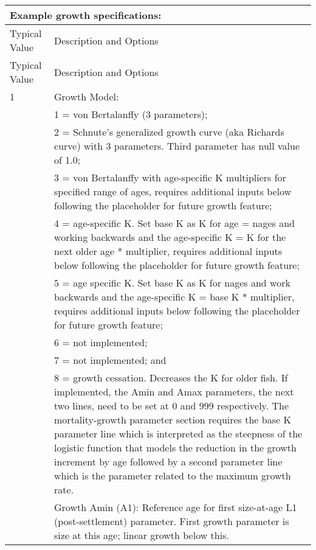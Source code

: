 \vspace*{-\baselineskip}	
\begin{longtable}{p{0.5cm} p{2cm} p{12.5cm}}
	\multicolumn{3}{l}{Example growth specifications:} \Tstrut\Bstrut\\
	\hline	
	\multicolumn{2}{l}{Typical Value} & Description and Options \Tstrut\Bstrut\\
	\hline
	\endfirsthead

	\hline
	\multicolumn{2}{l}{Typical Value} & Description and Options \Tstrut\Bstrut\\
	\hline
	\endhead
	\hline

	\endfoot
	
	\endlastfoot

	1 & & Growth Model: \Tstrut\\
	  & & 1 = von Bertalanffy (3 parameters); \\
	  & & 2 = Schnute's generalized growth curve (aka Richards curve) with 3 parameters. Third parameter has null value of 1.0; \\
	  & & 3 = von Bertalanffy with age-specific K multipliers for specified range of ages, requires additional inputs below following the placeholder for future growth feature; \\
	  & & 4 = age-specific K. Set base K as K for age = nages and working backwards and the age-specific K = K for the next older age * multiplier, requires additional inputs below following the placeholder for future growth feature; \\
	  & & 5 = age specific K. Set base K as K for nages and work backwards and the age-specific K = base K * multiplier, requires additional inputs below following the placeholder for future growth feature; \\
	  & & 6 = not implemented; \\
	  & & 7 = not implemented; and \\
	  & & 8 = growth cessation. Decreases the K for older fish. If implemented, the Amin and Amax parameters, the next two lines, need to be set at 0 and 999 respectively. The mortality-growth parameter section requires the base K parameter line which is interpreted as the steepness of the logistic function that models the reduction in the growth increment by age followed by a second parameter line which is the parameter related to the maximum growth rate. \Bstrut\\
	\hline

	\Tstrut 1 & & Growth Amin (A1): Reference age for first size-at-age L1 (post-settlement) parameter. First growth parameter is size at this age; linear growth below this. \Bstrut\\


\end{longtable}
